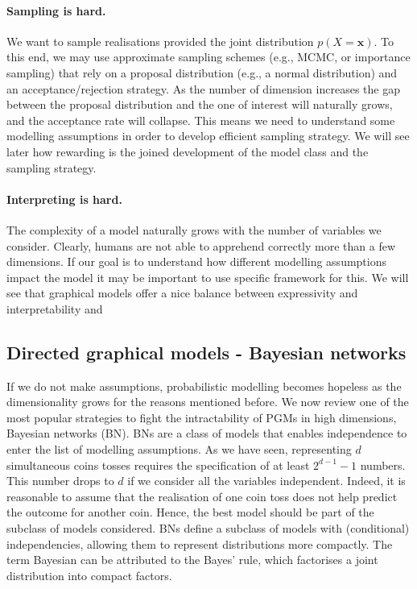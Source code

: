\paragraph{Sampling is hard.} We want to sample realisations provided the joint distribution $p(X=\bm x)$. To this end, we may use approximate sampling schemes (e.g., MCMC, or importance sampling) that rely on a proposal distribution (e.g., a normal distribution) and an acceptance/rejection strategy. As the number of dimension increases the gap between the proposal distribution and the one of interest will naturally grows, and the acceptance rate will collapse. This means we need to understand some modelling assumptions in order to develop efficient sampling strategy. We will see later how rewarding is the joined development of the model class and the sampling strategy.

\paragraph{Interpreting is hard.} The complexity of a model naturally grows with the number of variables we consider. Clearly, humans are not able to apprehend correctly more than a few dimensions. If our goal is to understand how different modelling assumptions impact the model it may be important to use specific framework for this. We will see that graphical models offer a nice balance between expressivity and interpretability and

\subsection{Directed graphical models - Bayesian networks}
If we do not make assumptions, probabilistic modelling becomes hopeless as the dimensionality grows for the reasons mentioned before. We now review one of the most popular strategies to fight the intractability of PGMs in high dimensions, Bayesian networks (BN). BNs are a class of models that enables independence to enter the list of modelling assumptions. As we have seen, representing $d$ simultaneous coins tosses requires the specification of at least $2^{d-1} - 1$ numbers. This number drops to $d$ if we consider all the variables independent. Indeed, it is reasonable to assume that the realisation of one coin toss does not help predict the outcome for another coin. Hence, the best model should be part of the subclass of models considered. BNs define a subclass of models with (conditional) independencies, allowing them to represent distributions more compactly. The term Bayesian can be attributed to the Bayes' rule, which factorises a joint distribution into compact factors.

